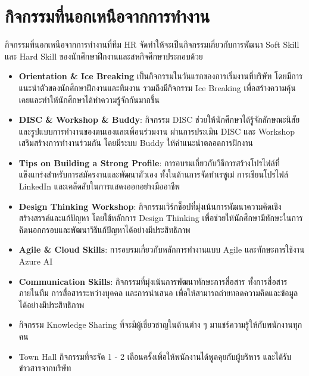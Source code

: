 \section{กิจกรรมที่นอกเหนือจากการทำงาน}
กิจกรรมที่นอกเหนือจากการทำงานที่ทีม HR จัดทำให้จะเป็นกิจกรรมเกี่ยวกับการพัฒนา Soft Skill และ Hard Skill ของนักศึกษาฝึกงานและสหกิจศึกษาประกอบด้วย
\begin{itemize}
      \item \textbf{Orientation \& Ice Breaking} เป็นกิจกรรมในวันแรกของการเริ่มงานที่บริษัท โดยมีการแนะนำตัวของนักศึกษาฝึกงานและทีมงาน รวมถึงมีกิจกรรม Ice Breaking เพื่อสร้างความคุ้นเคยและทำให้นักศึกษาได้ทำความรู้จักกันมากขึ้น
      \item \textbf{DISC \& Workshop \& Buddy}: กิจกรรม DISC ช่วยให้นักศึกษาได้รู้จักลักษณะนิสัยและรูปแบบการทำงานของตนเองและเพื่อนร่วมงาน ผ่านการประเมิน DISC และ Workshop เสริมสร้างการทำงานร่วมกัน โดยมีระบบ Buddy ให้คำแนะนำตลอดการฝึกงาน
      \item \textbf{Tips on Building a Strong Profile}: การอบรมเกี่ยวกับวิธีการสร้างโปรไฟล์ที่แข็งแกร่งสำหรับการสมัครงานและพัฒนาตัวเอง ทั้งในด้านการจัดทำเรซูเม่ การเขียนโปรไฟล์ LinkedIn และเคล็ดลับในการแสดงออกอย่างมืออาชีพ
      \item \textbf{Design Thinking Workshop}: กิจกรรมเวิร์กช็อปที่มุ่งเน้นการพัฒนาความคิดเชิงสร้างสรรค์และแก้ปัญหา โดยใช้หลักการ Design Thinking เพื่อช่วยให้นักศึกษามีทักษะในการคิดนอกกรอบและพัฒนาวิธีแก้ปัญหาได้อย่างมีประสิทธิภาพ
      \item \textbf{Agile \& Cloud Skills}: การอบรมเกี่ยวกับหลักการทำงานแบบ Agile และทักษะการใช้งาน Azure AI
      \item \textbf{Communication Skills}: กิจกรรมที่มุ่งเน้นการพัฒนาทักษะการสื่อสาร ทั้งการสื่อสารภายในทีม การสื่อสารระหว่างบุคคล และการนำเสนอ เพื่อให้สามารถถ่ายทอดความคิดและข้อมูลได้อย่างมีประสิทธิภาพ
      \item กิจกรรม Knowledge Sharing ที่จะมีผู้เชี่ยวชาญในด้านต่าง ๆ มาแชร์ความรู้ให้กับพนักงานทุกคน
      \item Town Hall กิจกรรมที่จะจัด 1 - 2 เดือนครั้งเพื่อให้พนักงานได้พูดคุยกับผู้บริหาร และได้รับข่าวสารจากบริษัท
\end{itemize}